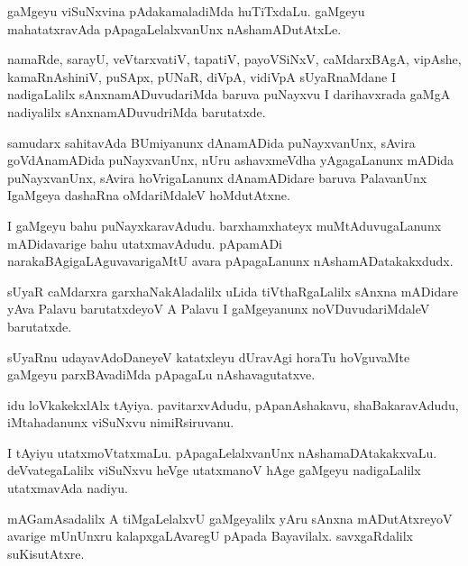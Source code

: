 \documentclass{article}
\begin{document}
\begin{mn}%
gaMgeyu viSuNxvina pAdakamaladiMda huTiTxdaLu. gaMgeyu mahatatxravAda pApagaLelalxvanUnx 
nAshamADutAtxLe.
\end{mn}

\begin{mn}%
namaRde, sarayU, veVtarxvatiV, tapatiV, payoVSiNxV, caMdarxBAgA, vipAshe, kamaRnAshiniV, 
puSApx, pUNaR, diVpA, vidiVpA sUyaRnaMdane I nadigaLalilx sAnxnamADuvudariMda baruva 
puNayxvu I darihavxrada gaMgA nadiyalilx sAnxnamADuvudriMda barutatxde.
\end{mn}

\begin{mn}%
samudarx sahitavAda BUmiyanunx dAnamADida puNayxvanUnx, sAvira goVdAnamADida puNayxvanUnx, 
nUru ashavxmeVdha yAgagaLanunx mADida puNayxvanUnx, sAvira hoVrigaLanunx dAnamADidare 
baruva PalavanUnx IgaMgeya dashaRna oMdariMdaleV hoMdutAtxne.
\end{mn}

\begin{mn}%
I gaMgeyu bahu puNayxkaravAdudu. barxhamxhateyx muMtAduvugaLanunx mADidavarige bahu 
utatxmavAdudu. pApamADi narakaBAgigaLAguvavarigaMtU avara pApagaLanunx nAshamADatakakxdudx.
\end{mn}

\begin{mn}%
sUyaR caMdarxra garxhaNakAladalilx uLida tiVthaRgaLalilx sAnxna mADidare yAva Palavu 
barutatxdeyoV A Palavu I gaMgeyanunx noVDuvudariMdaleV barutatxde.
\end{mn}

\begin{mn}%
sUyaRnu udayavAdoDaneyeV katatxleyu dUravAgi horaTu hoVguvaMte gaMgeyu parxBAvadiMda 
pApagaLu nAshavagutatxve.
\end{mn}

\begin{mn}%
idu loVkakekxlAlx tAyiya. pavitarxvAdudu, pApanAshakavu, shaBakaravAdudu, iMtahadanunx 
viSuNxvu nimiRsiruvanu.
\end{mn}

\begin{mn}%
I tAyiyu utatxmoVtatxmaLu. pApagaLelalxvanUnx nAshamaDAtakakxvaLu. deVvategaLalilx viSuNxvu 
heVge utatxmanoV hAge gaMgeyu nadigaLalilx utatxmavAda nadiyu.
\end{mn}

\begin{mn}%
mAGamAsadalilx A tiMgaLelalxvU gaMgeyalilx yAru sAnxna mADutAtxreyoV avarige mUnUnxru 
kalapxgaLAvaregU pApada Bayavilalx. savxgaRdalilx suKisutAtxre.
\end{mn}
\end{document}
